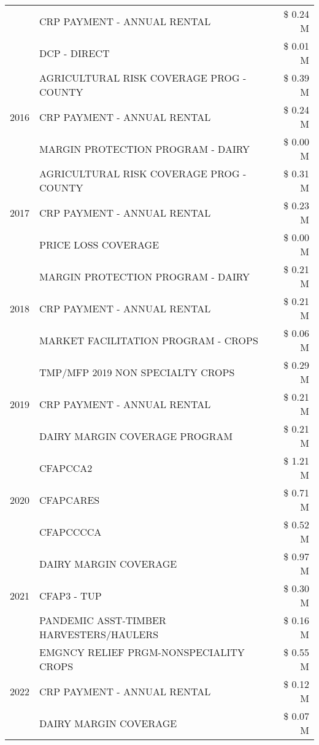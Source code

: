 \begin{tabular}{llr}
 & CRP PAYMENT - ANNUAL RENTAL & \$ 0.24 M \\
 & DCP - DIRECT & \$ 0.01 M \\
\cline{1-3}
\multirow[t]{3}{*}{2016} & AGRICULTURAL RISK COVERAGE PROG - COUNTY & \$ 0.39 M \\
 & CRP PAYMENT - ANNUAL RENTAL & \$ 0.24 M \\
 & MARGIN PROTECTION PROGRAM - DAIRY & \$ 0.00 M \\
\cline{1-3}
\multirow[t]{3}{*}{2017} & AGRICULTURAL RISK COVERAGE PROG - COUNTY & \$ 0.31 M \\
 & CRP PAYMENT - ANNUAL RENTAL & \$ 0.23 M \\
 & PRICE LOSS COVERAGE & \$ 0.00 M \\
\cline{1-3}
\multirow[t]{3}{*}{2018} & MARGIN PROTECTION PROGRAM - DAIRY & \$ 0.21 M \\
 & CRP PAYMENT - ANNUAL RENTAL & \$ 0.21 M \\
 & MARKET FACILITATION PROGRAM - CROPS & \$ 0.06 M \\
\cline{1-3}
\multirow[t]{3}{*}{2019} & TMP/MFP 2019 NON SPECIALTY CROPS & \$ 0.29 M \\
 & CRP PAYMENT - ANNUAL RENTAL & \$ 0.21 M \\
 & DAIRY MARGIN COVERAGE PROGRAM & \$ 0.21 M \\
\cline{1-3}
\multirow[t]{3}{*}{2020} & CFAPCCA2 & \$ 1.21 M \\
 & CFAPCARES & \$ 0.71 M \\
 & CFAPCCCCA & \$ 0.52 M \\
\cline{1-3}
\multirow[t]{3}{*}{2021} & DAIRY MARGIN COVERAGE & \$ 0.97 M \\
 & CFAP3 - TUP & \$ 0.30 M \\
 & PANDEMIC ASST-TIMBER HARVESTERS/HAULERS & \$ 0.16 M \\
\cline{1-3}
\multirow[t]{3}{*}{2022} & EMGNCY RELIEF PRGM-NONSPECIALITY CROPS & \$ 0.55 M \\
 & CRP PAYMENT - ANNUAL RENTAL & \$ 0.12 M \\
 & DAIRY MARGIN COVERAGE & \$ 0.07 M \\
\cline{1-3}
\bottomrule
\end{tabular}
